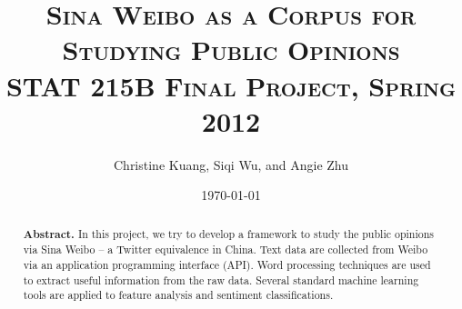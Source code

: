 \documentclass[11pt]{article}
\title{\scshape Sina Weibo as a Corpus for Studying Public Opinions
	\\{\Large STAT 215B Final Project, Spring 2012} }
\author{Christine Kuang, Siqi Wu, and Angie Zhu}
\date{\today} %
\newcommand{\1}[1]{{\mathbf 1}\left\{#1\right\}}        %
\begin{document}
\setlength\footskip{0.5in}


\lstset{
showspaces=false, 
language=R, 
basicstyle=\ttfamily, 
tabsize=3, 
showstringspaces=false, 
columns=flexible%
}

\maketitle








\begin{abstract}
{\bf Abstract.} In this project, we try to develop a framework to study the public opinions via Sina Weibo -- a Twitter equivalence in China. Text data are collected from  Weibo via an application programming interface (API). Word processing techniques are used to extract useful information from the raw data. Several standard machine learning tools are applied to feature analysis and sentiment classifications. 
\end{abstract}
\end{document}

